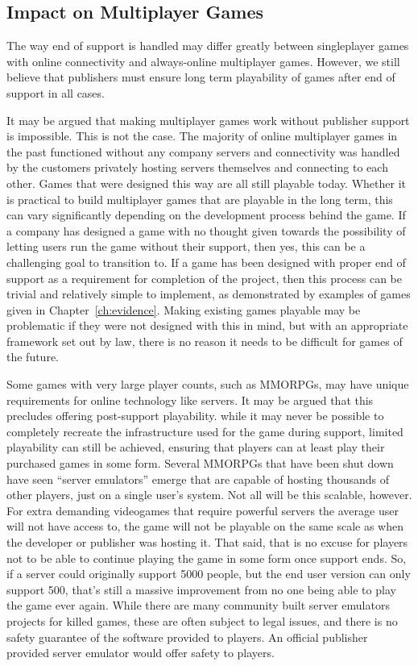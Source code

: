 \subsection{Impact on Multiplayer Games}
The way end of support is handled may differ greatly between singleplayer games with online connectivity and always-online multiplayer games.
However, we still believe that publishers must ensure long term playability of games after end of support in all cases.

It may be argued that making multiplayer games work without publisher support is impossible.
This is not the case.
The majority of online multiplayer games in the past functioned without any company servers
and connectivity was handled by the customers privately hosting servers themselves and connecting to each other.
Games that were designed this way are all still playable today.
Whether it is practical to build multiplayer games that are playable in the long term, this can vary significantly depending on the development process behind the game.
If a company has designed a game with no thought given towards the possibility of letting users run the game without their support, then yes,
this can be a challenging goal to transition to.
If a game has been designed with proper end of support as a requirement for completion of the project, then this process can be trivial and relatively simple to implement,
as demonstrated by examples of games given in Chapter~\ref{ch:evidence}.
Making existing games playable may be problematic if they were not designed with this in mind,
but with an appropriate framework set out by law, there is no reason it needs to be difficult for games of the future.

Some games with very large player counts, such as MMORPGs, may have unique requirements for online technology like servers.
It may be argued that this precludes offering post-support playability.
while it may never be possible to completely recreate the infrastructure used for the game during support,
limited playability can still be achieved, ensuring that players can at least play their purchased games in some form.
Several MMORPGs that have been shut down have seen ``server emulators'' emerge that are capable of hosting thousands of other players, just on a single user's system.
Not all will be this scalable, however.
For extra demanding videogames that require powerful servers the average user will not have access to,
the game will not be playable on the same scale as when the developer or publisher was hosting it.
That said, that is no excuse for players not to be able to continue playing the game in some form once support ends.
So, if a server could originally support 5000 people, but the end user version can only support 500,
that's still a massive improvement from no one being able to play the game ever again.
While there are many community built server emulators projects for killed games\cite{emulator-list-2022},
these are often subject to legal issues, and there is no safety guarantee of the software provided to players.
An official publisher provided server emulator would offer safety to players.

